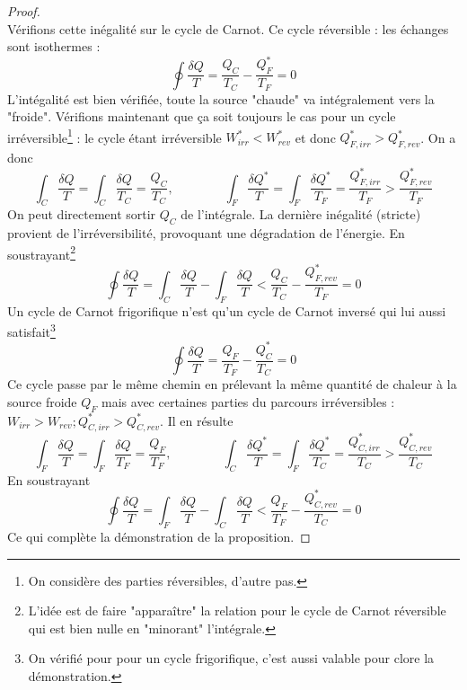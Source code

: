 	\begin{proof}\ \\
	Vérifions cette inégalité sur le cycle de Carnot. Ce cycle réversible : les 
	échanges sont isothermes :
	\begin{equation}
	\oint \dfrac{\delta Q}{T} = \dfrac{Q_C}{T_C} - \dfrac{Q_F^*}{T_F} = 0
	\end{equation}
	L'intégalité est bien vérifiée, toute la source "chaude" va intégralement vers 
	la "froide". Vérifions maintenant que ça soit toujours le 
	cas pour un cycle irréversible\footnote{On considère des parties réversibles, 
	d'autre pas.} : le cycle étant irréversible $W_{irr}^* < W_{rev}^*$ et donc 
	$Q_{F,irr}^* > Q_{F,rev}^*$. On a donc 
	\begin{equation}
	\int_C \dfrac{\delta Q}{T} = \int_C \dfrac{\delta Q}{T_C} = \dfrac{Q_C}{T_C}, 
	\qquad\qquad
	\int_F \dfrac{\delta Q^*}{T} = \int_F \dfrac{\delta Q^*}{T_F} = \dfrac{Q_{F,irr}^*}{T_F} 
	> \dfrac{Q_{F,rev}^*}{T_F} 
	\end{equation}
	On peut directement sortir $Q_C$ de l'intégrale. La dernière inégalité (stricte) 
	provient de l'irréversibilité, provoquant une dégradation de l'énergie. En 
	soustrayant\footnote{L'idée est de faire "apparaître" la relation pour le cycle 
	de Carnot réversible qui est bien nulle en "minorant" l'intégrale.}
	\begin{equation}
	\oint \dfrac{\delta Q}{T} = \int_C \dfrac{\delta Q}{T}-\int_F\dfrac{\delta Q}{T} 
	< \dfrac{Q_C}{T_C}-\dfrac{Q_{F,rev}^*}{T_F} = 0
	\end{equation}
	Un cycle de Carnot frigorifique n'est qu'un cycle de Carnot inversé qui lui 
	aussi satisfait\footnote{On vérifié pour pour un cycle frigorifique, c'est 
	aussi valable pour clore la démonstration.}
	\begin{equation}
	\oint \dfrac{\delta Q}{T} = \dfrac{Q_F}{T_F}-\dfrac{Q_C^*}{T_C} = 0
	\end{equation}
	Ce cycle passe par le même chemin en prélevant la même quantité de chaleur à la 
	source froide $Q_F$ mais avec certaines parties du parcours irréversibles : 
	$W_{irr} > W_{rev} ; Q_{C,irr}^* > Q_{C,rev}^*$. Il en résulte
	\begin{equation}
	\int_F \dfrac{\delta Q}{T} = \int_F \dfrac{\delta Q}{T_F} = \dfrac{Q_F}{T_F}, 
	\qquad\qquad
	\int_C \dfrac{\delta Q^*}{T} = \int_F \dfrac{\delta Q^*}{T_C} = \dfrac{Q_{C,irr}^*}{T_C} 
	> \dfrac{Q_{C,rev}^*}{T_C} 
	\end{equation}
	En 	soustrayant
	\begin{equation}
	\oint \dfrac{\delta Q}{T} = \int_F \dfrac{\delta Q}{T}-\int_C\dfrac{\delta Q}{T} 
	< \dfrac{Q_F}{T_F}-\dfrac{Q_{C,rev}^*}{T_C} = 0
	\end{equation}
	Ce qui complète la démonstration de la proposition.
	\end{proof}
	
